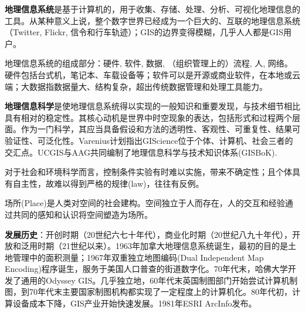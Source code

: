 \par \textbf{地理信息系统}是基于计算机的，用于收集、存储、处理、分析、可视化地理信息的工具。从某种意义上说，整个数字世界已经成为一个巨大的、互联的地理信息系统（Twitter, Flickr, 信令和行车轨迹）；GIS的边界变得模糊，几乎人人都是GIS用户。

\par 地理信息系统的组成部分：硬件, 软件, 数据, （组织管理上的）流程, 人, 网络。硬件包括台式机，笔记本、车载设备等；软件可以是开源或商业软件，在本地或云端；大数据指数据量大、结构复杂，超出传统数据管理和处理工具能力。

\par \textbf{地理信息科学}是使地理信息系统得以实现的一般知识和重要发现，与技术细节相比具有相对的稳定性。其核心动机是世界中时空现象的表达，包括形式和过程两个层面。作为一门科学，其应当具备假设和方法的透明性、客观性、可重复性、结果可验证性、可泛化性。Varenius计划指出GIScience位于个体、计算机、社会三者的交汇点。UCGIS与AAG共同编制了地理信息科学与技术知识体系(GISBoK). 

\par 对于社会和环境科学而言，控制条件实验有时难以实施，带来不确定性；且个体具有自主性，故难以得到严格的规律(law)，往往有反例。

\par 场所(Place)是人类对空间的社会建构。空间独立于人而存在，人的交互和经验通过共同的感知和认识将空间塑造为场所。

\par \textbf{发展历史}：开创时期（20世纪六七十年代），商业化时期（20世纪八九十年代），开放和泛用时期（21世纪以来）。1963年加拿大地理信息系统诞生，最初的目的是土地管理中的面积测量；1967年双重独立地图编码(Dual Independent Map Encoding)程序诞生，服务于美国人口普查的街道数字化。70年代末，哈佛大学开发了通用的Odyssey GIS。几乎独立地，60年代末英国制图部门开始尝试计算机制图，到70年代末主要国家制图机构都实现了一定程度上的计算机化。80年代初，计算设备成本下降，GIS产业开始快速发展。1981年ESRI ArcInfo发布。

